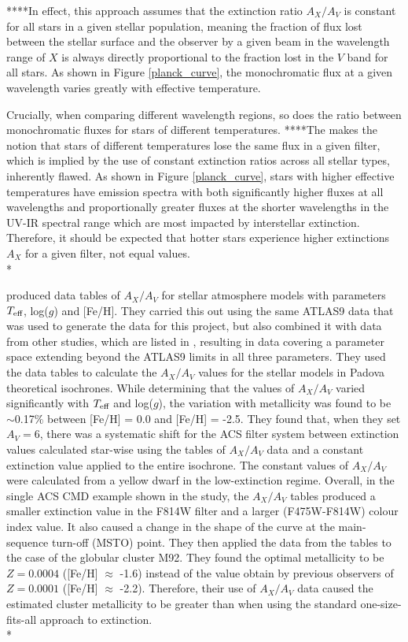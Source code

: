 \documentclass[12pt, a4paper]{report}
\begin{document}
****In effect, this approach assumes that the extinction ratio $A_{X}/A_{V}$ is constant for all stars in a given stellar population, meaning the fraction of flux lost between the stellar surface and the observer by a given beam in the wavelength range of $X$ is always directly proportional to the fraction lost in the $V$ band for all stars. As shown in Figure \ref{planck_curve}, the monochromatic flux at a given wavelength varies greatly with effective temperature.

Crucially, when comparing different wavelength regions, so does the ratio between monochromatic fluxes for stars of different temperatures. ****The makes the notion that stars of different temperatures lose the same flux in a given filter, which is implied by the use of constant extinction ratios across all stellar types, inherently flawed. As shown in Figure \ref{planck_curve}, stars with higher effective temperatures have emission spectra with both significantly higher fluxes at all wavelengths and proportionally greater fluxes at the shorter wavelengths in the UV-IR spectral range which are most impacted by interstellar extinction. Therefore, it should be expected that hotter stars experience higher extinctions $A_{X}$ for a given filter, not equal values.\\*

\cite{2008PASP..120..583G} produced data tables of $A_{X}/A_{V}$ for stellar atmosphere models with parameters $T_{\textnormal{eff}}$, log($g$) and [Fe/H]. They carried this out using the same ATLAS9 data \citep{2004astro.ph..5087C} that was used to generate the data for this project, but also combined it with data from other studies, which are listed in \cite{2002A&A...391..195G}, resulting in data covering a parameter space extending beyond the ATLAS9 limits in all three parameters. They used the data tables to calculate the $A_{X}/A_{V}$ values for the stellar models in Padova theoretical isochrones. While determining that the values of $A_{X}/A_{V}$ varied significantly with $T_{\textnormal{eff}}$ and log($g$), the variation with metallicity was found to be $\sim$0.17$\%$ between [Fe/H] = 0.0 and [Fe/H] = -2.5. They found that, when they set $A_{V} = 6$, there was a systematic shift for the ACS filter system between extinction values calculated star-wise using the tables of $A_{X}/A_{V}$ data and a constant extinction value applied to the entire isochrone. The constant values of $A_{X}/A_{V}$ were calculated from a yellow dwarf in the low-extinction regime. Overall, in the single ACS CMD example shown in the study, the $A_{X}/A_{V}$ tables produced a smaller extinction value in the F814W filter and a larger (F475W-F814W) colour index value. It also caused a change in the shape of the curve at the main-sequence turn-off (MSTO) point. They then applied the data from the tables to the case of the globular cluster M92. They found the optimal metallicity to be $Z = 0.0004$ ([Fe/H] $\approx$ -1.6) instead of the value obtain by previous observers of $Z = 0.0001$ ([Fe/H] $\approx$ -2.2). Therefore, their use of $A_{X}/A_{V}$ data caused the estimated cluster metallicity to be greater than when using the standard one-size-fits-all approach to extinction.\\*
\end{document}
